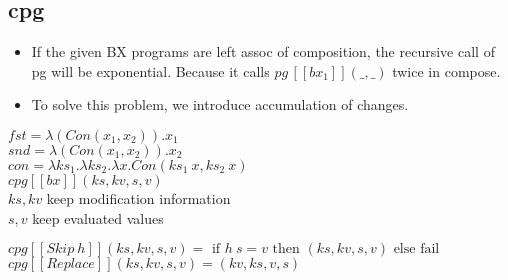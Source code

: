 \documentclass[runningheads]{llncs}
\newcommand{\tab}{\hspace*{5mm}}
\newcommand{\pg}[3]{pg \, [\![#1]\!] (#2, #3)}
\newcommand{\cpg}[5]{cpg [\![#1]\!] (#2, #3, #4, #5)}
\begin{document}

\subsection{cpg}

\begin{itemize}
\item If the given BX programs are left assoc of composition, the recursive call of pg will be exponential. Because it calls $\pg{bx_1}{\_}{\_}$ twice in compose.
\item To solve this problem, we introduce accumulation of changes.
\end{itemize}

$fst = \lambda (Con (x_1, x_2)). x_1$\\
$snd = \lambda (Con (x_1, x_2)). x_2$\\
$con = \lambda ks_1. \lambda ks_2. \lambda x. Con(ks_1 \ x, ks_2 \ x)$\\

$\cpg{bx}{ks}{kv}{s}{v}$ \\
    \tab $ks, kv$ keep modification information\\
    \tab $s, v$ keep evaluated values\\

\vspace{3mm}

$\cpg{Skip \ h}{ks}{kv}{s}{v} = \text{ if } h \ s = v \text{ then } (ks, kv, s, v) \text{ else fail}$\\

$\cpg{Replace}{ks}{kv}{s}{v} = (kv, ks, v, s)$\\
\end{document}
